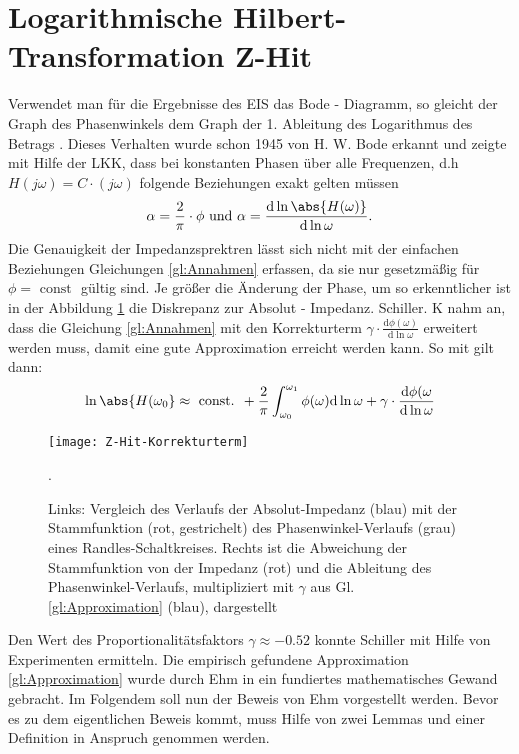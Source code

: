 \section{Logarithmische Hilbert-Transformation Z-Hit}\label{num:z-hit}
Verwendet man für die Ergebnisse des EIS das Bode - Diagramm, so gleicht der Graph des Phasenwinkels dem Graph der 1. Ableitung des Logarithmus des Betrags \label{vermutung}. Dieses Verhalten wurde schon 1945 von H. W. Bode \cite{Bode1956} erkannt und zeigte mit Hilfe der LKK, dass bei konstanten Phasen über alle Frequenzen, d.h $H(j \omega) = C \cdot (j \omega)$ folgende Beziehungen exakt gelten müssen \cite{Schiller2012} %
\begin{align}
\alpha = \frac{2}{\pi} \cdot \phi \text{ und } \alpha = \frac{\mathrm{d} \ln{\abs{H(\omega)}}}{\mathrm{d \ln{\omega}}} \text{.}  \label{gl:Annahmen}
\end{align}
Die Genauigkeit der Impedanzsprektren lässt sich nicht mit der einfachen Beziehungen Gleichungen \ref{gl:Annahmen} erfassen, da sie nur gesetzmäßig für  $\phi = \text{ const }$ gültig sind. Je größer die Änderung der Phase, um so erkenntlicher ist in der Abbildung \ref{fig:Z-Hit-Korrekturterm} die Diskrepanz zur Absolut - Impedanz. Schiller. K \cite{Schiller2012} nahm an, dass die Gleichung \ref{gl:Annahmen} mit den Korrekturterm $\gamma \cdot \frac{\mathrm{d} \phi(\omega)}{\mathrm{d} \ln{\omega}}$ erweitert werden muss, damit eine gute Approximation erreicht werden kann. So mit gilt dann: 
\begin{align}
\ln{\abs{H(\omega_0}} \approx \text{ const. } + \frac{2}{\pi} \int_{\omega_0}^{\omega_1} \phi(\omega) \mathrm{d} \ln{\omega} + \gamma \cdot \frac{\mathrm{d} \phi(\omega}{\mathrm{d}\ln{\omega}} \label{gl:Approximation}
\end{align}\cite{Schiller2012} %
\begin{figure}[htbp] 
  \centering
     \texttt{[image: Z-Hit-Korrekturterm]}
  \caption{Links: Vergleich des Verlaufs der Absolut-Impedanz (blau) mit der Stammfunktion (rot, gestrichelt) des Phasenwinkel-Verlaufs (grau) eines Randles-Schaltkreises. Rechts ist die Abweichung der Stammfunktion von der Impedanz (rot) und die Ableitung des Phasenwinkel-Verlaufs, multipliziert mit $\gamma$ aus Gl. \ref{gl:Approximation} (blau), dargestellt\cite{Schiller2012}}.
  \label{fig:Z-Hit-Korrekturterm}
\end{figure}
Den Wert des Proportionalitätsfaktors $\gamma \approx -0.52$ konnte Schiller mit Hilfe von Experimenten ermitteln. Die empirisch gefundene Approximation \ref{gl:Approximation} wurde durch Ehm \cite{Schiller2012} in ein fundiertes mathematisches Gewand gebracht. Im Folgendem soll nun der Beweis von Ehm vorgestellt werden. Bevor es zu dem eigentlichen Beweis kommt, muss Hilfe von zwei Lemmas und einer Definition in Anspruch genommen werden.
